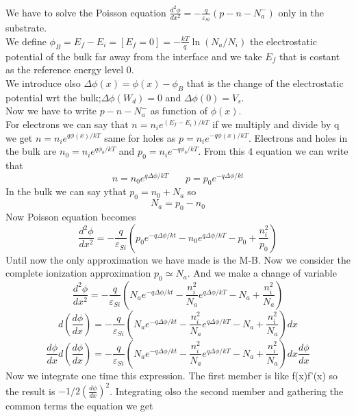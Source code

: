 We have to solve the Poisson equation $\frac{d^2\phi}{dx^2}=-\frac{q}{\varepsilon_{Si}}(p-n-N_a^-)$ only in the substrate.\\
We define $\phi_B=E_f-E_i=[E_f=0]=-\frac{kT}{q}\ln(N_a/N_i)$ the electrostatic potential of the bulk far away from the interface and we take $E_f$ that is costant as the reference energy level 0.\\
We introduce olso $\Delta \phi (x)=\phi(x)-\phi_B$  that is the change of the electrostatic potential wrt the bulk;$\Delta \phi (W_d)=0$ and $\Delta \phi (0)=V_s$.\\
\vspace{5mm}
Now we have to write $p-n-N_a^-$ as function of $\phi(x)$.\\
For electrons we can say that $n=n_ie^{(E_f-E_i)/kT}$ if we multiply and divide by q we get $n=n_ie^{q\phi(x)/kT}$ same for holes as $p=n_ie^{-q\phi(x)/kT}$. Electrons and holes in the bulk are $n_0=n_ie^{q\phi_b/kT}$ and $p_0=n_ie^{-q\phi_b/kT}$. From this 4 equation we can write that 
\begin{equation}
n=n_0e^{q\Delta \phi/kT} \ \ \ \ \ \ \ \ p=p_0e^{-q\Delta \phi/kt}
\end{equation}
In the bulk we can say ythat $p_0=n_0+N_a$ so 
\begin{equation}
N_a=p_0-n_0
\end{equation}
Now Poisson equation becomes 
\begin{equation}
\frac{d^2\phi}{dx^2}=-\frac{q}{\varepsilon_{Si}}(p_0e^{-q\Delta \phi/kt}-n_0e^{q\Delta \phi/kT}-p_0+\frac{n_i^2}{p_0})
\end{equation}
Until now the only approximation we have made is the M-B. Now we consider the complete ionization approximation $p_0\simeq N_a$. And we make a change of variable 
\begin{equation}
\frac{d^2\phi}{dx^2}=-\frac{q}{\varepsilon_{Si}}(N_ae^{-q\Delta \phi/kt}-\frac{n_i^2}{N_a}e^{q\Delta \phi/kT}-N_a+\frac{n_i^2}{N_a})
\end{equation}
\begin{equation}
d(\frac{d\phi}{dx})=-\frac{q}{\varepsilon_{Si}}(N_ae^{-q\Delta \phi/kt}-\frac{n_i^2}{N_a}e^{q\Delta \phi/kT}-N_a+\frac{n_i^2}{N_a})dx
\end{equation}
\begin{equation}
\frac{d\phi}{dx}d(\frac{d\phi}{dx})=-\frac{q}{\varepsilon_{Si}}(N_ae^{-q\Delta \phi/kt}-\frac{n_i^2}{N_a}e^{q\Delta \phi/kT}-N_a+\frac{n_i^2}{N_a})dx\frac{d\phi}{dx}
\end{equation}
Now we integrate one time this expression. The first member is like f(x)f'(x) so the result is $-1/2(\frac{d\phi}{dx})^2$. Integrating olso the second member and gathering the common terms the equation we get
